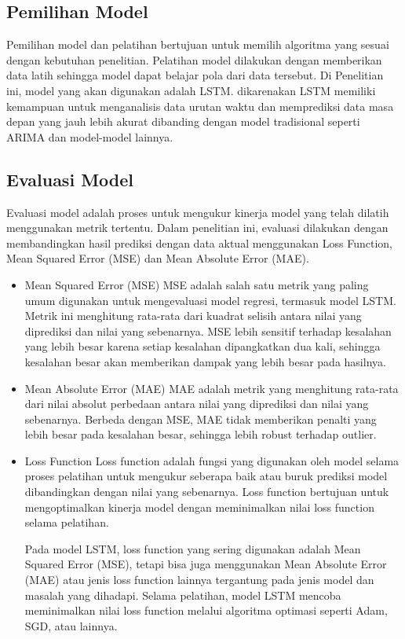 \begin{subs}
	\subsection{Pemilihan Model}
	\indent

	Pemilihan model dan pelatihan bertujuan untuk memilih algoritma yang sesuai dengan kebutuhan penelitian. Pelatihan model dilakukan dengan memberikan data latih sehingga model dapat belajar pola dari data tersebut.
	Di Penelitian ini, model yang akan digunakan adalah LSTM. dikarenakan LSTM memiliki kemampuan untuk menganalisis data urutan waktu dan memprediksi data masa depan yang jauh lebih akurat dibanding dengan model tradisional seperti ARIMA dan model-model lainnya.

	\subsection{Evaluasi Model}
	\indent

	Evaluasi model adalah proses untuk mengukur kinerja model yang telah dilatih menggunakan metrik tertentu. Dalam penelitian ini, evaluasi dilakukan dengan membandingkan hasil prediksi dengan data aktual menggunakan Loss Function, Mean Squared Error (MSE) dan Mean Absolute Error (MAE).
	\begin{itemize}
		\item Mean Squared Error (MSE)
		      MSE adalah salah satu metrik yang paling umum digunakan untuk mengevaluasi model regresi, termasuk model LSTM. Metrik ini menghitung rata-rata dari kuadrat selisih antara nilai yang diprediksi dan nilai yang sebenarnya. MSE lebih sensitif terhadap kesalahan yang lebih besar karena setiap kesalahan dipangkatkan dua kali, sehingga kesalahan besar akan memberikan dampak yang lebih besar pada hasilnya.
		\item Mean Absolute Error (MAE)
		      MAE adalah metrik yang menghitung rata-rata dari nilai absolut perbedaan antara nilai yang diprediksi dan nilai yang sebenarnya. Berbeda dengan MSE, MAE tidak memberikan penalti yang lebih besar pada kesalahan besar, sehingga lebih robust terhadap outlier.
		\item Loss Function
		      Loss function adalah fungsi yang digunakan oleh model selama proses pelatihan untuk mengukur seberapa baik atau buruk prediksi model dibandingkan dengan nilai yang sebenarnya. Loss function bertujuan untuk mengoptimalkan kinerja model dengan meminimalkan nilai loss function selama pelatihan.

		      Pada model LSTM, loss function yang sering digunakan adalah Mean Squared Error (MSE), tetapi bisa juga menggunakan Mean Absolute Error (MAE) atau jenis loss function lainnya tergantung pada jenis model dan masalah yang dihadapi. Selama pelatihan, model LSTM mencoba meminimalkan nilai loss function melalui algoritma optimasi seperti Adam, SGD, atau lainnya.
	\end{itemize}


\end{subs}
